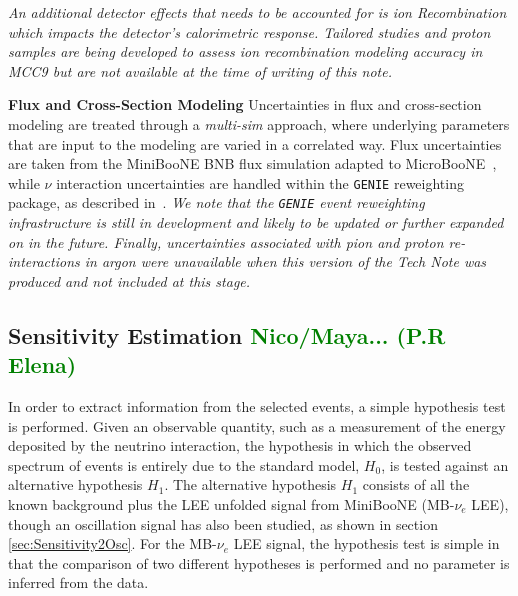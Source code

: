\emph{An additional detector effects that needs to be accounted for is ion Recombination which impacts the detector's calorimetric response. Tailored studies and proton samples are being developed to assess ion recombination modeling accuracy in MCC9 but are not available at the time of writing of this note.}
\par \noindent \textbf{Flux and Cross-Section Modeling} Uncertainties in flux and cross-section modeling are treated through a \emph{multi-sim} approach, where underlying parameters that are input to the modeling are varied in a correlated way. Flux uncertainties are taken from the MiniBooNE BNB flux simulation adapted to MicroBooNE~\cite{bib:fluxmcc9,bib:fluxtechnote}, while $\nu$ interaction uncertainties are handled within the \texttt{GENIE} reweighting package, as described in~\cite{bib:geniesupportnote}. \emph{We note that the \texttt{GENIE} event reweighting infrastructure is still in development and likely to be updated or further expanded on in the future. Finally, uncertainties associated with pion and proton re-interactions in argon were unavailable when this version of the Tech Note was produced and not included at this stage.} 

\subsection{Sensitivity Estimation \textcolor{green}{Nico/Maya... (P.R Elena)}}
In order to extract information from the selected events, a simple hypothesis test is performed.
Given an observable quantity, such as a measurement of the energy deposited by the neutrino interaction, the hypothesis in which the observed spectrum of events is entirely due to the standard model, $H_0$, is tested against an alternative hypothesis $H_1$.
The alternative hypothesis $H_1$ consists of all the known background plus the LEE unfolded signal from MiniBooNE (MB-$\nu_e$ LEE), though an oscillation signal has also been studied, as shown in section \ref{sec:Sensitivity2Osc}.
For the MB-$\nu_e$ LEE signal, the hypothesis test is simple in that the comparison of two different hypotheses is performed and no parameter is inferred from the data.


